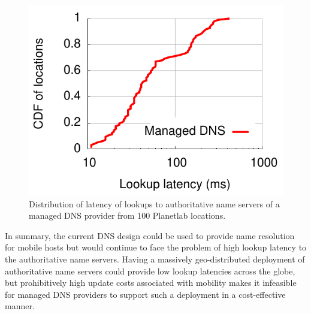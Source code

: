 {\begin{figure}
\centering
\includegraphics[scale=0.5]{graph/newgraphs/lookup-location.pdf}
\vspace{-0.1in}
\caption{Distribution of latency of lookups to authoritative name servers of a managed DNS provider from 100 Planetlab locations.}
\label{fig:lookuplocation}
\vspace{-0.1in}
\end{figure}




In summary, the current DNS design could be used to provide name resolution for mobile hosts but would continue to face the problem of high lookup latency to the authoritative name servers. Having a massively geo-distributed deployment of authoritative name servers could provide low lookup latencies across the globe, but prohibitively high update costs associated with mobility makes it infeasible for managed DNS providers to support such a deployment in a cost-effective manner.
}

%
%
%
%
%



